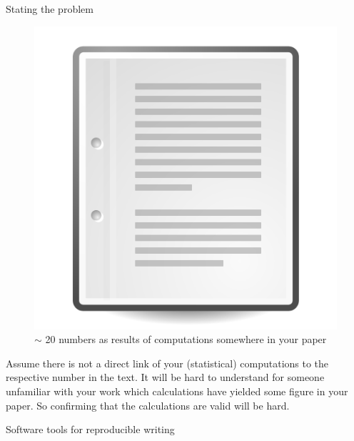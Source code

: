 \documentclass[final,hyperref={pdfpagelabels=false}]{beamer}
\begin{document}
\begin{frame}{}
\begin{columns}[t]
\begin{column}{.48\linewidth}
\begin{block}{Stating the problem}
\begin{minipage}[t]{0.55\textwidth}
\begin{figure}[ht]
             \includegraphics[valign=T,scale=.5]{logo/paper_icon}
                 \caption{ $\sim$ 20 numbers as results of computations somewhere in your paper} 
           \end{figure}
          \end{minipage}   
          \newline
          Assume there is not a direct link of your (statistical) computations to the respective number in the text.
          It will be hard to understand for someone unfamiliar with your work which calculations have yielded some figure in your paper. So confirming that the calculations are valid will be hard.  
         \end{block}     

      
      
  \begin{block}{Software tools for reproducible writing}
    

\end{block}
\end{column}
\end{columns}
\end{frame}
\end{document}
